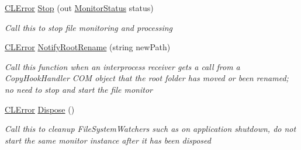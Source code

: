 \begin{DoxyCompactItemize}
$$\hyperlink{class_cloud_api_public_1_1_model_1_1_c_l_error}{C\-L\-Error} \hyperlink{class_cloud_api_public_1_1_file_monitor_1_1_monitor_agent_ae9123602c7ba50f698e71b6904ba8cb6}{Stop} (out \hyperlink{namespace_cloud_api_public_1_1_static_a31db95951688473984962a22ad05a45f}{Monitor\-Status} status)
\begin{DoxyCompactList}\small\item\em Call this to stop file monitoring and processing \end{DoxyCompactList}\item 
\hyperlink{class_cloud_api_public_1_1_model_1_1_c_l_error}{C\-L\-Error} \hyperlink{class_cloud_api_public_1_1_file_monitor_1_1_monitor_agent_a71d7f3790206a3cc461bf843ecbe1ba2}{Notify\-Root\-Rename} (string new\-Path)
\begin{DoxyCompactList}\small\item\em Call this function when an interprocess receiver gets a call from a Copy\-Hook\-Handler C\-O\-M object that the root folder has moved or been renamed; no need to stop and start the file monitor \end{DoxyCompactList}\item 
\hyperlink{class_cloud_api_public_1_1_model_1_1_c_l_error}{C\-L\-Error} \hyperlink{class_cloud_api_public_1_1_file_monitor_1_1_monitor_agent_a6bdf7564ecf0dc66d9490d51d19e2694}{Dispose} ()
\begin{DoxyCompactList}\small\item\em Call this to cleanup File\-System\-Watchers such as on application shutdown, do not start the same monitor instance after it has been disposed \end{DoxyCompactList}\end{DoxyCompactItemize}
